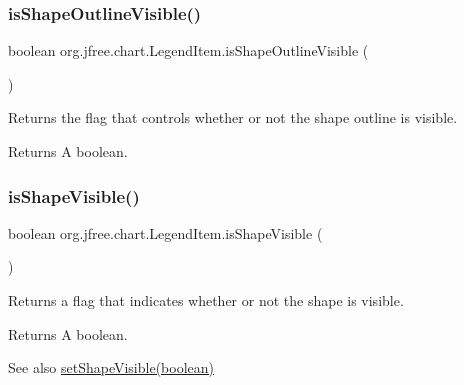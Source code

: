 \subsubsection{\texorpdfstring{is\+Shape\+Outline\+Visible()}{isShapeOutlineVisible()}}
{\footnotesize\ttfamily boolean org.\+jfree.\+chart.\+Legend\+Item.\+is\+Shape\+Outline\+Visible (\begin{DoxyParamCaption}{ }\end{DoxyParamCaption})}

Returns the flag that controls whether or not the shape outline is visible.

\begin{DoxyReturn}{Returns}
A boolean. 
\end{DoxyReturn}
\mbox{\label{classorg_1_1jfree_1_1chart_1_1_legend_item_a549f04415c2224b5c62def05fdcfe3c0}} 
\subsubsection{\texorpdfstring{is\+Shape\+Visible()}{isShapeVisible()}}
{\footnotesize\ttfamily boolean org.\+jfree.\+chart.\+Legend\+Item.\+is\+Shape\+Visible (\begin{DoxyParamCaption}{ }\end{DoxyParamCaption})}

Returns a flag that indicates whether or not the shape is visible.

\begin{DoxyReturn}{Returns}
A boolean.
\end{DoxyReturn}
\begin{DoxySeeAlso}{See also}
\mbox{\hyperlink{classorg_1_1jfree_1_1chart_1_1_legend_item_a87c9eb5f4151a2f1c3e753db786d7690}{set\+Shape\+Visible(boolean)}} 
\end{DoxySeeAlso}
\mbox{\label{classorg_1_1jfree_1_1chart_1_1_legend_item_ae7b3428f8a2c602ca6a6915a62b184eb}} 
